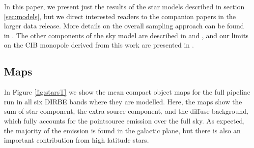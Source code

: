 \documentclass{aa}
\begin{document}
In this paper, we present just the results of the star models described in section \ref{sec:models}, but we direct interested readers to the companion papers in the larger data release. More details on the overall sampling approach can be found in \citet{CG02_01}. The other components of the sky model are described in \citet{CG02_02} and \citet{CG02_05}, and our limits on the CIB monopole derived from this work are presented in \citet{CG02_03}. 


\subsection{Maps}

In Figure \ref{fig:starsT} we show the mean compact object maps for the full pipeline run in all six DIRBE bands where they are modelled. Here, the maps show the sum of star component, the extra source component, and the diffuse background, which fully accounts for the pointsource emission over the full sky. As expected, the majority of the emission is found in the galactic plane, but there is also an important contribution from high latitude stars.
\end{document}
